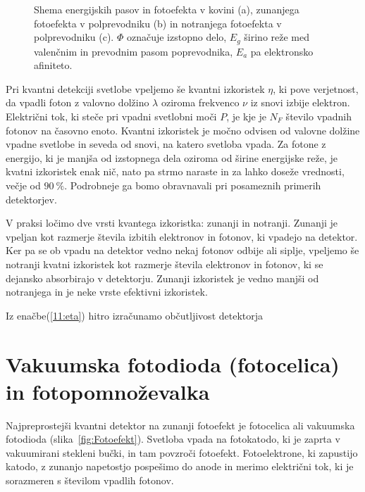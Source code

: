 \begin{figure}[h]
\centering
\def\svgwidth{80truemm} 

\caption{Shema energijskih pasov in fotoefekta v kovini (a), 
zunanjega fotoefekta v polprevodniku (b) in notranjega fotoefekta v polprevodniku (c). 
$\Phi$ označuje izstopno delo, $E_g$ širino reže med valenčnim in prevodnim pasom poprevodnika,
$E_a$ pa elektronsko afiniteto. }
\label{fig:Nivoji}
\end{figure}

Pri kvantni detekciji svetlobe vpeljemo še kvantni izkoristek $\eta$,
ki pove verjetnost, da vpadli foton z valovno dolžino $\lambda$ oziroma frekvenco $\nu$ iz 
snovi izbije elektron. Električni tok, ki steče pri vpadni svetlobni moči $P$, je
kje je $N_F$ število vpadnih fotonov na časovno enoto.
Kvantni izkoristek je močno odvisen od valovne dolžine vpadne svetlobe in seveda
od snovi, na katero svetloba vpada. Za fotone z energijo, ki je manjša od izstopnega 
dela oziroma od širine energijske reže, 
je kvatni izkoristek enak nič, nato pa strmo naraste in za
lahko doseže vrednosti, večje od $90~\%$. Podrobneje ga bomo 
obravnavali pri posameznih primerih detektorjev.

\begin{remark}
V praksi ločimo dve vrsti kvantega izkoristka: zunanji in notranji. Zunanji je vpeljan kot 
razmerje števila izbitih elektronov in fotonov, ki vpadejo na detektor. Ker pa se 
ob vpadu na detektor vedno nekaj fotonov odbije ali siplje, vpeljemo še notranji kvatni 
izkoristek kot razmerje števila elektronov in fotonov, ki se dejansko absorbirajo v detektorju.
Zunanji izkoristek je vedno manjši od notranjega in je neke vrste efektivni izkoristek.
\end{remark}

Iz enačbe(\ref{11:eta}) hitro izračunamo občutljivost detektorja 

\section{Vakuumska fotodioda (fotocelica) in fotopomnoževalka}

Najpreprostejši kvantni detektor na zunanji fotoefekt je fotocelica ali vakuumska fotodioda
(slika~\ref{fig:Fotoefekt}). 
Svetloba vpada na fotokatodo, ki je zaprta v vakuumirani stekleni bučki, in tam povzroči
fotoefekt. Fotoelektrone, ki zapustijo katodo, z zunanjo napetostjo pospešimo do anode 
in merimo električni tok, ki je sorazmeren s številom vpadlih fotonov. 



